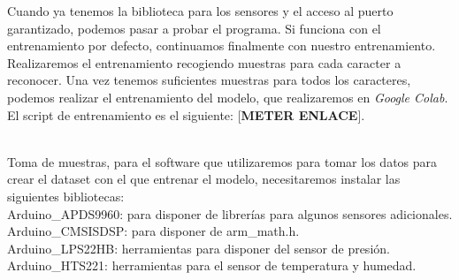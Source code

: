 \begin{mimargen}{-0.65cm}{-1cm}
Cuando ya tenemos la biblioteca para los sensores y el acceso al puerto garantizado,
podemos pasar a probar el programa.
Si funciona con el entrenamiento por defecto, continuamos finalmente con nuestro
entrenamiento.\\
Realizaremos el entrenamiento recogiendo muestras para cada caracter a
reconocer. Una vez tenemos suficientes muestras para todos los caracteres, podemos
realizar el entrenamiento del modelo, que realizaremos en \textit{Google Colab}.
El script de entrenamiento es el siguiente: [\textbf{METER ENLACE}].

~\\
Toma de muestras, para el software que utilizaremos para tomar los datos
para crear el dataset con el que entrenar el modelo, necesitaremos instalar las
siguientes bibliotecas:\\
\cite{apds9960} Arduino\_APDS9960: para disponer de librerías para algunos sensores adicionales.\\
\cite{cmsisdsp} Arduino\_CMSIS\-DSP: para disponer de arm\_math.h.\\
\cite{lps22hb} Arduino\_LPS22HB: herramientas para disponer del sensor de presión.\\
\cite{hts221} Arduino\_HTS221: herramientas para el sensor de temperatura y humedad.

\end{mimargen}